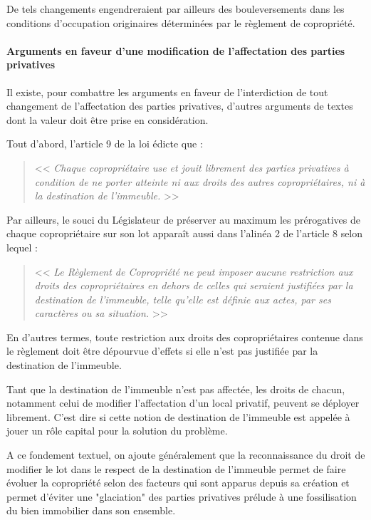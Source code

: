 				De tels changements engendreraient par ailleurs des bouleversements dans les conditions d'occupation originaires déterminées par le règlement de copropriété.
			
			\paragraph{Arguments en faveur d'une modification de l'affectation des parties privatives}

				Il existe, pour combattre les arguments en faveur de l'interdiction de tout changement de l'affectation des parties privatives, d'autres arguments de textes dont la valeur doit être prise en considération.
				
				Tout d'abord, l'article 9 de la loi édicte que :
				\begin{quote}
					<< {\itshape Chaque copropriétaire use et jouit librement des parties privatives \lips à condition de ne porter atteinte ni aux droits des autres copropriétaires, ni à la destination de l'immeuble.} >>
				\end{quote}
				
				Par ailleurs, le souci du Législateur de préserver au maximum les prérogatives de chaque copropriétaire sur son lot apparaît aussi dans l'alinéa 2 de l'article 8 selon lequel :
				\begin{quote}
					<< {\itshape Le Règlement de Copropriété ne peut imposer aucune restriction aux droits des copropriétaires en dehors de celles qui seraient justifiées par la destination de l'immeuble, telle qu'elle est définie aux actes, par ses caractères ou sa situation.} >>
				\end{quote}
				
				En d'autres termes, toute restriction aux droits des copropriétaires contenue dans le règlement doit être dépourvue d'effets si elle n'est pas justifiée par la destination de l'immeuble.
				
				Tant que la destination de l'immeuble n'est pas affectée, les droits de chacun, notamment celui de modifier l'affectation d'un local privatif, peuvent se déployer librement. C'est dire si cette notion de destination de l'immeuble est appelée à jouer un rôle capital pour la solution du problème.
				
				A ce fondement textuel, on ajoute généralement que la reconnaissance du droit de modifier le lot dans le respect de la destination de l'immeuble permet de faire évoluer la copropriété selon des facteurs qui sont apparus depuis sa création et permet d'éviter une "glaciation" des parties privatives prélude à une fossilisation du bien immobilier dans son ensemble.
		
